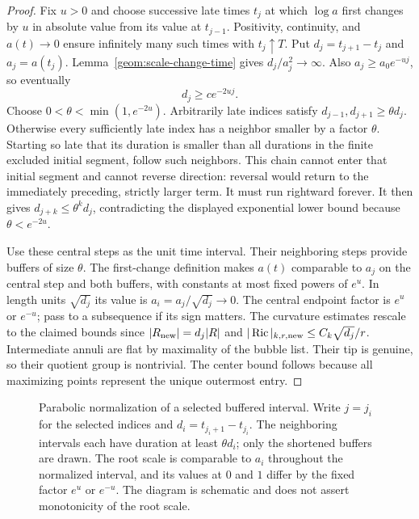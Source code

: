 \begin{proof}
Fix $u>0$ and choose successive late times $t_j$ at which
$\log a$ first changes by $u$ in absolute value from its value at
$t_{j-1}$. Positivity, continuity, and $a(t)\to0$ ensure infinitely
many such times with $t_j\uparrow T$. Put
$d_j=t_{j+1}-t_j$ and $a_j=a(t_j)$.
Lemma~\ref{geom:scale-change-time} gives $d_j/a_j^2\to\infty$.
Also $a_j\geq a_0e^{-uj}$, so eventually
\[
 d_j\geq c e^{-2uj}.
\]
Choose $0<\theta<\min(1,e^{-2u})$. Arbitrarily late indices satisfy
$d_{j-1},d_{j+1}\geq\theta d_j$. Otherwise every sufficiently late
index has a neighbor smaller by a factor $\theta$. Starting so late
that its duration is smaller than all durations in the finite
excluded initial segment, follow such neighbors. This chain cannot
enter that initial segment and cannot reverse direction: reversal
would return to the immediately preceding, strictly larger term.
It must run rightward forever. It then gives
$d_{j+k}\leq\theta^k d_j$, contradicting the displayed exponential
lower bound because $\theta<e^{-2u}$.

Use these central steps as the unit time interval. Their neighboring
steps provide buffers of size $\theta$. The first-change definition
makes $a(t)$ comparable to $a_j$ on the central step and both
buffers, with constants at most fixed powers of $e^u$.
In length units $\sqrt{d_j}$ its value is
$a_i=a_j/\sqrt{d_j}\to0$. The central endpoint factor is $e^{u}$
or $e^{-u}$; pass to a subsequence if its sign matters.
The curvature estimates rescale to the claimed bounds since
$|R_{\rm new}|=d_j|R|$ and
$|\operatorname{Ric}|_{k,r,\rm new}\leq C_k\sqrt{d_j}/r$.
Intermediate annuli are flat by maximality of the bubble list.
Their tip is genuine, so their quotient group is nontrivial.
The center bound follows because all maximizing points represent
the unique outermost entry.
\end{proof}

\begin{figure}[htbp]
 \centering
 
 \caption{Parabolic normalization of a selected buffered interval.
Write $j=j_i$ for the selected indices and
$d_i=t_{j_i+1}-t_{j_i}$.  The neighboring intervals each have duration
at least $\theta d_i$; only the shortened buffers are drawn.
The root scale is comparable to $a_i$ throughout the normalized
interval, and its values at $0$ and $1$ differ by the fixed factor
$e^u$ or $e^{-u}$.  The diagram is schematic and does not assert
monotonicity of the root scale.}
 \label{fig:buffered-intervals}
\end{figure}

